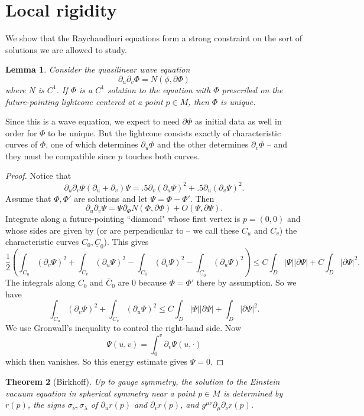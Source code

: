 \documentclass[12pt]{report}
\newtheorem{theorem}{Theorem}[chapter]
\newtheorem{lemma}[theorem]{Lemma}
\theoremstyle{definition}
\theoremstyle{remark}
\begin{document}
\section{Local rigidity}
We show that the Raychaudhuri equations form a strong constraint on the sort of solutions we are allowed to study.
\begin{lemma}
    Consider the quasilinear wave equation
    $$\partial_u\partial_v \Phi = N(\phi, \partial \Phi)$$
    where $N$ is $C^1$. If $\Phi$ is a $C^1$ solution to the equation with $\Phi$ prescribed on the future-pointing lightcone centered at a point $p \in M$, then $\Phi$ is unique.
\end{lemma}
Since this is a wave equation, we expect to need $\partial \Phi$ as initial data as well in order for $\Phi$ to be unique. But the lightcone consists exactly of characteristic curves of $\Phi$, one of which determines $\partial_u \Phi$ and the other determines $\partial_v \Phi$ -- and they must be compatible since $p$ touches both curves.
\begin{proof}
    Notice that
    $$\partial_u \partial_v \Psi (\partial_u + \partial_v) \Psi = .5 \partial_v(\partial_u \Psi)^2 + .5 \partial_u(\partial_v \Psi)^2.$$
    Assume that $\Phi, \Phi'$ are solutions and let $\Psi = \Phi - \Phi'$. Then
    $$\partial_u \partial_v \Psi = \Psi\partial_\Phi N(\Phi, \partial \Phi) +  O(\Psi, \partial \Psi).$$
    Integrate along a future-pointing ``diamond" whose first vertex is $p = (0, 0)$ and whose sides are given by (or are perpendicular to -- we call these $C_u$ and $C_v$) the characteristic curves $C_0, \underline C_0$). This gives
$$\frac{1}{2}\left(\int_{C_u} (\partial_v \Psi)^2 + \int_{C_v} (\partial_u \Psi)^2  - \int_{C_0} (\partial_v \Psi)^2 - \int_{\underline C_0} (\partial_u \Psi)^2 \right) \leq C \int_D |\Psi| |\partial \Psi| + C\int_D |\partial \Psi|^2.$$
    The integrals along $C_0$ and $\overline C_0$ are $0$ because $\Phi = \Phi'$ there by assumption. So we have
    $$\int_{C_u} (\partial_v \Psi)^2 + \int_{C_v} (\partial_u \Psi)^2 \leq C \int_D |\Psi| |\partial \Psi| + \int_D |\partial \Psi|^2.$$
    We use Gronwall's inequality to control the right-hand side. 
    Now
    $$\Psi(u, v) = \int_0^v \partial_v \Psi(u, \cdot)$$
    which then vanishes. So this energy estimate gives $\Psi = 0$.
\end{proof}
\begin{theorem}[Birkhoff]
    Up to gauge symmetry, the solution to the Einstein vacuum equation in spherical symmetry near a point $p \in M$ is determined by $r(p)$, the signs $\sigma_\nu, \sigma_\lambda$ of $\partial_u r(p)$ and $\partial_v r(p)$, and $g^{\mu\nu} \partial_\mu \partial_\nu r(p)$.
\end{theorem}
\end{document}
